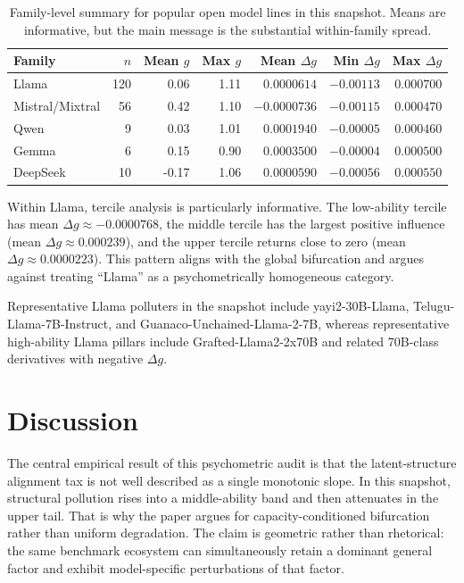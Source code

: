 \documentclass[11pt]{article}
\begin{document}
\begin{table}[H]
\centering
\small
\begin{tabular}{@{}lrrrrrr@{}}
\toprule
Family & $n$ & Mean $g$ & Max $g$ & Mean $\Delta g$ & Min $\Delta g$ & Max $\Delta g$ \\
\midrule
Llama & 120 & 0.06 & 1.11 & $0.0000614$ & $-0.00113$ & $0.000700$ \\
Mistral/Mixtral & 56 & 0.42 & 1.10 & $-0.0000736$ & $-0.00115$ & $0.000470$ \\
Qwen & 9 & 0.03 & 1.01 & $0.0001940$ & $-0.00005$ & $0.000460$ \\
Gemma & 6 & 0.15 & 0.90 & $0.0003500$ & $-0.00004$ & $0.000500$ \\
DeepSeek & 10 & -0.17 & 1.06 & $0.0000590$ & $-0.00056$ & $0.000550$ \\
\bottomrule
\end{tabular}
\caption{Family-level summary for popular open model lines in this snapshot. Means are informative, but the main message is the substantial within-family spread.}
\label{tab:families}
\end{table}

Within Llama, tercile analysis is particularly informative. The low-ability tercile has mean $\Delta g\approx-0.0000768$, the middle tercile has the largest positive influence (mean $\Delta g \approx 0.000239$), and the upper tercile returns close to zero (mean $\Delta g \approx 0.0000223$). This pattern aligns with the global bifurcation and argues against treating ``Llama'' as a psychometrically homogeneous category.

Representative Llama polluters in the snapshot include yayi2-30B-Llama, Telugu-Llama-7B-Instruct, and Guanaco-Unchained-Llama-2-7B, whereas representative high-ability Llama pillars include Grafted-Llama2-2x70B and related 70B-class derivatives with negative $\Delta g$.

\section{Discussion}
The central empirical result of this psychometric audit is that the latent-structure alignment tax is not well described as a single monotonic slope. In this snapshot, structural pollution rises into a middle-ability band and then attenuates in the upper tail. That is why the paper argues for capacity-conditioned bifurcation rather than uniform degradation. The claim is geometric rather than rhetorical: the same benchmark ecosystem can simultaneously retain a dominant general factor and exhibit model-specific perturbations of that factor.
\end{document}
